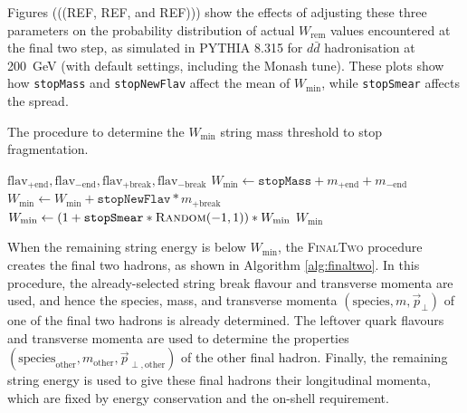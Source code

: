 \documentclass[12pt,a4paper]{report}
\begin{document}
Figures (((REF, REF, and REF))) show the effects of adjusting these three parameters on the probability distribution of actual $W_\text{rem}$ values encountered at the final two step, as simulated in PYTHIA 8.315 for $d\bar{d}$ hadronisation at \qty{200}{\giga\electronvolt} (with default settings, including the Monash tune). These plots show how \texttt{stopMass} and \texttt{stopNewFlav} affect the mean of $W_\text{min}$, while \texttt{stopSmear} affects the spread.

\begin{algorithm}
  \caption{The procedure to determine the $W_\text{min}$ string mass threshold to stop fragmentation.}\label{alg:wmin}
  \begin{algorithmic}
     {$\text{flav}_{+\text{end}},\text{flav}_{-\text{end}}, \text{flav}_{+\text{break}},\text{flav}_{-\text{break}}$}
      \State $W_\text{min} \gets \texttt{stopMass} + m_{+\text{end}} + m_{-\text{end}}$
      \State $W_\text{min} \gets W_\text{min} + \texttt{stopNewFlav} * m_{+\text{break}}$
      \State $W_\text{min} \gets (1 + \texttt{stopSmear} *\textsc{Random}(-1, 1) )*W_\text{min} $
      \State \Return $W_\text{min}$
    \EndProcedure
  \end{algorithmic}
\end{algorithm}

When the remaining string energy is below $W_\text{min}$, the \textsc{FinalTwo} procedure creates the final two hadrons, as shown in Algorithm \ref{alg:finaltwo}. In this procedure, the already-selected string break flavour and transverse momenta are used, and hence the species, mass, and transverse momenta $(\text{species}, m, \vec{p}_\perp)$ of one of the final two hadrons is already determined. The leftover quark flavours and transverse momenta are used to determine the properties $(\text{species}_\text{other}, m_\text{other}, \vec{p}_{\perp,\text{other}})$ of the other final hadron. Finally, the remaining string energy is used to give these final hadrons their longitudinal momenta, which are fixed by energy conservation and the on-shell requirement.
\end{document}
